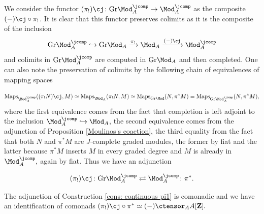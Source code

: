\documentclass[10pt,reqno]{amsart}
\numberwithin{equation}{section}
\newcommand{\ZZ}{\mathbf{Z}}
\newcommand{\Maps}{\mathrm{Maps}}
\newcommand{\Gr}{\mathrm{Gr}}
\newcommand{\into}{\hookrightarrow}
\begin{document}
\begin{construction}\label{cons: continuous pi1}
We consider the functor $(\pi_!)\cj\colon \Gr\Mod_A^\jcomp\to \Mod^\jcomp_A$ as the composite $(-)\cj\circ\pi_!$. It is clear that this functor preserves colimits as it is the composite of the inclusion $$\Gr\Mod_A^\jcomp\into\Gr\Mod_A \xrightarrow{\pi_!}\Mod_A\xrightarrow{(-)\cj}\Mod_A^\jcomp$$ and colimits in $\Gr\Mod_A^\jcomp$ are computed in $\Gr\Mod_A$ and then completed.
One can also note the preservation of colimits by the following chain of equivalences of mapping spaces

$$\Maps_{\Mod_A^\jcomp}((\pi_!N)\cj,M)\simeq \Maps_{\Mod_A}(\pi_!N,M)\simeq \Maps_{\Gr\Mod}(N,\pi^*M)=\Maps_{\Gr\Mod_A^\jcomp}(N,\pi^*M),$$ where the first equivalence comes from the fact that completion is left adjoint to the inclusion $\Mod_A^\jcomp\into \Mod_A$, the second equivalence comes from the adjunction of Proposition \ref{Moulinos's coaction}, the third equality from the fact that both $N$ and $\pi^*M$ are $J$-complete graded modules, the former by fiat and the latter because $\pi^*M$ inserts $M$ in every graded degree and $M$ is already in $\Mod_A^\jcomp,$ again by fiat.
 Thus we have an adjunction

$$(\pi_!)\cj\colon \Gr\Mod_A^\jcomp\rightleftarrows \Mod_A^\jcomp\colon \pi^*.$$
\end{construction}

\begin{proposition}\label{prop: cts monad mod}
    The adjunction of Construction \ref{cons: continuous pi1} is comonadic and we have an identification of comonads $(\pi_!)\cj\circ \pi^*\simeq (-)\ctensor_A A[\ZZ].$
\end{proposition}
\end{document}
